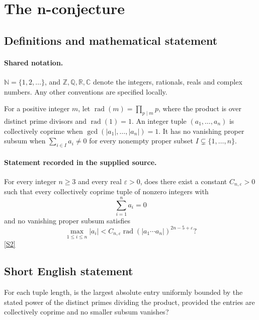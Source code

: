 \documentclass[11pt]{article}
\newcommand{\sref}[2]{\hyperlink{source:#1:#2}{[S#2]}}
\begin{document}
\section{The n-conjecture}\label{statement}

\subsection{Definitions and mathematical statement}

\paragraph{Shared notation.}$\mathbb N=\{1,2,\ldots\}$, and $\mathbb Z,\mathbb Q,\mathbb R,\mathbb C$ denote the integers, rationals, reals and complex numbers. Any other conventions are specified locally.


For a positive integer $m$, let $\operatorname{rad}(m)=\prod_{p\mid m}p$, where the product is over distinct prime divisors and $\operatorname{rad}(1)=1$. An integer tuple $(a_1,\ldots,a_n)$ is collectively coprime when $\gcd(|a_1|,\ldots,|a_n|)=1$. It has no vanishing proper subsum when $\sum_{i\in I}a_i\ne0$ for every nonempty proper subset $I\subsetneq\{1,\ldots,n\}$.
\paragraph{Statement recorded in the supplied source.}
For every integer $n\ge3$ and every real $\varepsilon>0$, does there exist a constant $C_{n,\varepsilon}>0$ such that every collectively coprime tuple of nonzero integers with
\[\sum_{i=1}^n a_i=0\]
and no vanishing proper subsum satisfies
\[\max_{1\le i\le n}|a_i|<C_{n,\varepsilon}\operatorname{rad}(|a_1\cdots a_n|)^{2n-5+\varepsilon}?\] \sref{statement}{2}
\subsection{Short English statement}
For each tuple length, is the largest absolute entry uniformly bounded by the stated power of the distinct primes dividing the product, provided the entries are collectively coprime and no smaller subsum vanishes?
\end{document}
